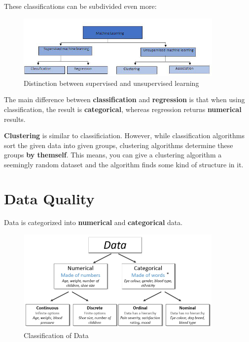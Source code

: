 \documentclass[11pt]{article}
\begin{document}
These classifications can be subdivided even more:

\begin{figure}[htb!]
    \centering
    \includegraphics[keepaspectratio=true, width=0.9\textwidth]{disciplines.jpg}
    \caption{Distinction between supervised and unsupervised learning}
    \label{fig:class}
\end{figure}

The main difference between \textbf{classification} and \textbf{regression} is that when using classification, the result is \textbf{categorical}, whereas regression returns \textbf{numerical} results.

\textbf{Clustering} is similar to classificiation. However, while classification algorithms sort the given data into given groups, clustering algorithms determine these groups \textbf{by themself}. This means, you can give a clustering algorithm a seemingly random dataset and the algorithm finds some kind of structure in it.

\newpage

\section{Data Quality}

Data is categorized into \textbf{numerical} and \textbf{categorical} data.

\begin{figure}[htb!]
    \centering
    \includegraphics[keepaspectratio=true, width=0.9\textwidth]{data_classification.png}
    \caption{Classification of Data}
    \label{fig:data_classification}
\end{figure}
\end{document}

